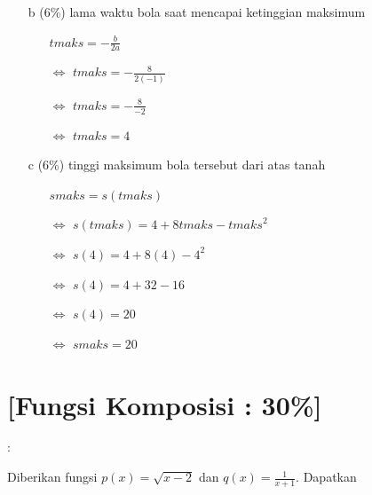 \documentclass[12pt, a4paper]{article}
\begin{document}
\begin{enumerate}
\begin{enumerate}
        \end{enumerate}
        \item[b] (6\%) lama waktu bola saat mencapai ketinggian maksimum
        \begin{enumerate}
            \item[] $t{\scriptstyle maks}=-\frac{b}{2a}$
            \item[$\Leftrightarrow$] $t{\scriptstyle maks}=-\frac{8}{2(-1)}$
            \item[$\Leftrightarrow$] $t{\scriptstyle maks}=-\frac{8}{-2}$
            \item[$\Leftrightarrow$] $t{\scriptstyle maks}=4$
        \end{enumerate}
        \item[c] (6\%) tinggi maksimum bola tersebut dari atas tanah
        \item[] \begin{enumerate}
            \item[] $s{\scriptstyle maks} = s(t{\scriptstyle maks})$
            \item[$\Leftrightarrow$] $s(t{\scriptstyle maks})=4 + 8t{\scriptstyle maks} - t{\scriptstyle maks}^2$
            \item[$\Leftrightarrow$] $s(4)=4 + 8(4) - 4^2$
            \item[$\Leftrightarrow$] $s(4)=4 + 32 - 16 $
            \item[$\Leftrightarrow$] $s(4)=20 $
            \item[$\Leftrightarrow$] $s{\scriptstyle maks}=20$
        \end{enumerate}
    \end{enumerate}
    \pagebreak

    \section{[{\bf Fungsi Komposisi} : 30\%]} : 
    
    Diberikan fungsi $p(x) = \sqrt{x - 2}$ dan $q(x) = \frac{1}{x + 1}$. Dapatkan
    
\end{document}

